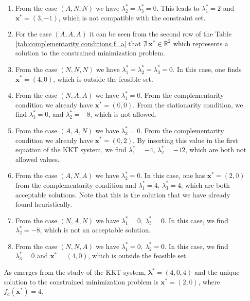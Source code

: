 \documentclass[a4paper,11pt]{article}
\begin{document}
\begin{enumerate}
	\item From the case $(A,N,N)$ we have $ \lambda_{2}^*=\lambda_{3}^*=0$. This leads to $\lambda_{1}^*=2$ and $\textbf{x}^*=(3,-1)$, which is not compatible with the constraint set.
	\item For the case $(A,A,A)$ it can be seen from the second row of the Table \ref{tab:complementarity conditions f_a} that $\nexists \ \textbf{x}^* \in \mathbb{R}^{2}$ which represents a solution to the constrained minimization problem.
	\item From the case $(N,N,N)$ we have $\lambda_{1}^*= \lambda_{2}^*= \lambda_{3}^*=0$. In this case, one finds $\textbf{x}^* = (4,0)$, which is outside the feasible set.
	\item From the case $(N,A,A)$ we have $\lambda_{1}^*=0$. From the complementarity condition we already have $\textbf{x}^*=(0,0)$. From the stationarity condition, we find $\lambda_{3}^*=0$, and $\lambda_{2}^*=-8$, which is not allowed.
	\item From the case $(A,A,N)$ we have $\lambda_{3}^*=0$. From the complementarity condition we already have $\textbf{x}^*=(0,2)$. By inserting this value in the first equation of the KKT system, we find $\lambda_{1}^*=-4$, $ \lambda_{2}^*=-12$, which are both not allowed values.
	\item From the case $(A,N,A)$ we have $\lambda_{2}^*=0$. In this case, one has $\textbf{x}^*=(2,0)$ from the complementarity condition and $\lambda_{1}^*=4$, $\lambda_{3}^*=4$, which are both acceptable solutions. Note that this is the solution that we have already found heuristically.
	\item From the case $(N, A, N)$ we have $\lambda_{1}^*=0,\ \lambda_{3}^*=0$. In this case, we find $\lambda_{2}^*=-8$, which is not an acceptable solution.
	\item From the case $(N, N, A)$ we have $\lambda_{1}^*=0,\ \lambda_{2}^*=0$. In this case, we find $\lambda_{3}^*=0$ and $\textbf{x}^*=(4,0)$, which is outside the feasible set.
\end{enumerate}

\noindent As emerges from the study of the KKT system, $\boldsymbol{\lambda}^*=(4,0,4)$ and the unique solution to the constrained minimization problem is $\textbf{x}^*=(2,0)$, where $f_{a}(\textbf{x}^*) = 4$.
\end{document}
